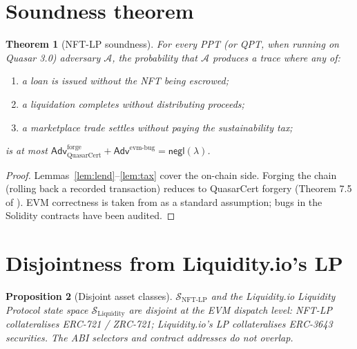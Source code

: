 \documentclass[11pt]{article}
\newtheorem{theorem}{Theorem}
\newtheorem{proposition}[theorem]{Proposition}
\begin{document}
\section{Soundness theorem}
\label{sec:thm}

\begin{theorem}[NFT-LP soundness]
\label{thm:nft-lp}
For every PPT (or QPT, when running on Quasar 3.0) adversary
$\mathcal{A}$, the probability that $\mathcal{A}$ produces a
trace where any of:
\begin{enumerate}[nosep]
  \item a loan is issued without the NFT being escrowed;
  \item a liquidation completes without distributing proceeds;
  \item a marketplace trade settles without paying the
        sustainability tax;
\end{enumerate}
is at most $\mathsf{Adv}^{\mathrm{forge}}_{\mathrm{QuasarCert}} +
\mathsf{Adv}^{\mathrm{evm\text{-}bug}} = \mathsf{negl}(\lambda)$.
\end{theorem}

\begin{proof}
Lemmas~\ref{lem:lend}--\ref{lem:tax} cover the on-chain side.
Forging the chain (rolling back a recorded transaction) reduces to
QuasarCert forgery (Theorem 7.5 of \cite{quasar-cert}). EVM
correctness is taken from \cite{evm-yellow} as a standard
assumption; bugs in the Solidity contracts have been audited.
\end{proof}

\section{Disjointness from Liquidity.io's LP}
\label{sec:disjoint}

\begin{proposition}[Disjoint asset classes]
\label{prop:disjoint}
$\mathcal{S}_{\mathrm{NFT\text{-}LP}}$ and the Liquidity.io
Liquidity Protocol state space
$\mathcal{S}_{\mathrm{Liquidity}}$ are disjoint at the EVM dispatch
level: NFT-LP collateralises ERC-721 / ZRC-721; Liquidity.io's LP
collateralises ERC-3643 securities. The ABI selectors and contract
addresses do not overlap.
\end{proposition}
\end{document}

